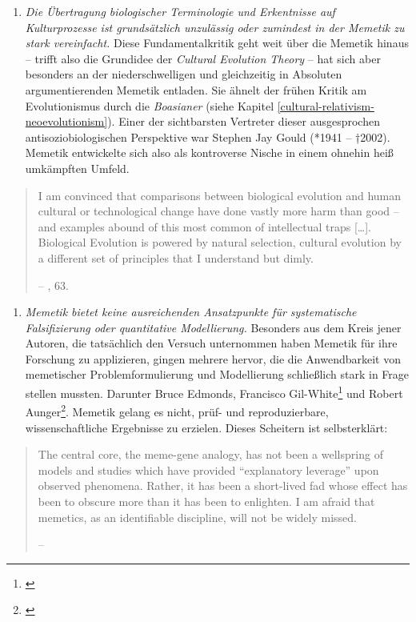 \documentclass[openany,twoside,twocolumn]{book}
\providecommand{\tightlist}{%
  \setlength{\itemsep}{0pt}\setlength{\parskip}{0pt}}
\let\rmarkdownfootnote\footnote%
\def\footnote{\protect\rmarkdownfootnote}
\begin{document}
\begin{enumerate}
\def\labelenumi{\arabic{enumi}.}
\tightlist
\item
  \emph{Die Übertragung biologischer Terminologie und Erkentnisse auf
  Kulturprozesse ist grundsätzlich unzulässig oder zumindest in der
  Memetik zu stark vereinfacht.} Diese Fundamentalkritik geht weit über
  die Memetik hinaus -- trifft also die Grundidee der \emph{Cultural
  Evolution Theory} -- hat sich aber besonders an der niederschwelligen
  und gleichzeitig in Absoluten argumentierenden Memetik entladen. Sie
  ähnelt der frühen Kritik am Evolutionismus durch die \emph{Boasianer}
  (siehe Kapitel \ref{cultural-relativism-neoevolutionism}). Einer der
  sichtbarsten Vertreter dieser ausgesprochen antisoziobiologischen
  Perspektive war Stephen Jay Gould (*1941 -- †2002). Memetik
  entwickelte sich also als kontroverse Nische in einem ohnehin heiß
  umkämpften Umfeld.
\end{enumerate}

\begin{quote}
I am convinced that comparisons between biological evolution and human
cultural or technological change have done vastly more harm than good --
and examples abound of this most common of intellectual traps
{[}\ldots{}{]}. Biological Evolution is powered by natural selection,
cultural evolution by a different set of principles that I understand
but dimly.

-- \textcite{gould_pandas_1991}, 63.
\end{quote}

\begin{enumerate}
\def\labelenumi{\arabic{enumi}.}
\setcounter{enumi}{1}
\tightlist
\item
  \emph{Memetik bietet keine ausreichenden Ansatzpunkte für
  systematische Falsifizierung oder quantitative Modellierung.}
  Besonders aus dem Kreis jener Autoren, die tatsächlich den Versuch
  unternommen haben Memetik für ihre Forschung zu applizieren, gingen
  mehrere hervor, die die Anwendbarkeit von memetischer
  Problemformulierung und Modellierung schließlich stark in Frage
  stellen mussten. Darunter Bruce Edmonds, Francisco Gil-White\footnote{\textcite{gil-white_common_2005-1}}
  und Robert Aunger\footnote{\textcite{aunger_darwinizing_2000}}.
  Memetik gelang es nicht, prüf- und reproduzierbare, wissenschaftliche
  Ergebnisse zu erzielen. Dieses Scheitern ist selbsterklärt:
\end{enumerate}

\begin{quote}
The central core, the meme-gene analogy, has not been a wellspring of
models and studies which have provided ``explanatory leverage'' upon
observed phenomena. Rather, it has been a short-lived fad whose effect
has been to obscure more than it has been to enlighten. I am afraid that
memetics, as an identifiable discipline, will not be widely missed.

-- \textcite{edmonds_revealed_2005}
\end{quote}
\end{document}
